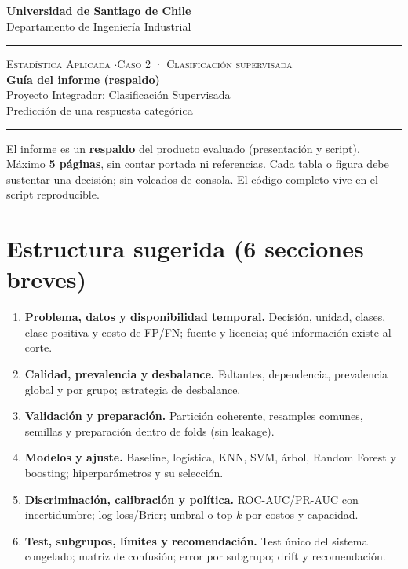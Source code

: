 \documentclass[11pt,letterpaper]{article}
\newcommand{\hrulethin}{\noindent\rule{\textwidth}{0.6pt}}
\begin{document}
\pagestyle{plain}
\begin{center}
    \textbf{\large Universidad de Santiago de Chile}\\[0.1cm]
    Departamento de Ingeniería Industrial
\end{center}
\vspace{0.15cm}\hrulethin\vspace{0.35cm}
\begin{center}
    {\scshape Estadística Aplicada \quad$\cdot$\quad Caso 2 · Clasificación supervisada}\\[0.35cm]
    {\LARGE \textbf{Guía del informe (respaldo)}}\\[0.15cm]
    {\large Proyecto Integrador: Clasificación Supervisada}\\[0.2cm]
    Predicción de una respuesta categórica
\end{center}
\vspace{0.2cm}\hrulethin\vspace{0.4cm}
El informe es un \textbf{respaldo} del producto evaluado (presentación y script). Máximo \textbf{5 páginas}, sin contar portada ni referencias. Cada tabla o figura debe sustentar una decisión; sin volcados de consola. El código completo vive en el script reproducible.

\section*{Estructura sugerida (6 secciones breves)}
\begin{enumerate}
\item \textbf{Problema, datos y disponibilidad temporal.} Decisión, unidad, clases, clase positiva y costo de FP/FN; fuente y licencia; qué información existe al corte.
\item \textbf{Calidad, prevalencia y desbalance.} Faltantes, dependencia, prevalencia global y por grupo; estrategia de desbalance.
\item \textbf{Validación y preparación.} Partición coherente, resamples comunes, semillas y preparación dentro de folds (sin leakage).
\item \textbf{Modelos y ajuste.} Baseline, logística, KNN, SVM, árbol, Random Forest y boosting; hiperparámetros y su selección.
\item \textbf{Discriminación, calibración y política.} ROC-AUC/PR-AUC con incertidumbre; log-loss/Brier; umbral o top-$k$ por costos y capacidad.
\item \textbf{Test, subgrupos, límites y recomendación.} Test único del sistema congelado; matriz de confusión; error por subgrupo; drift y recomendación.
\end{enumerate}
\end{document}
